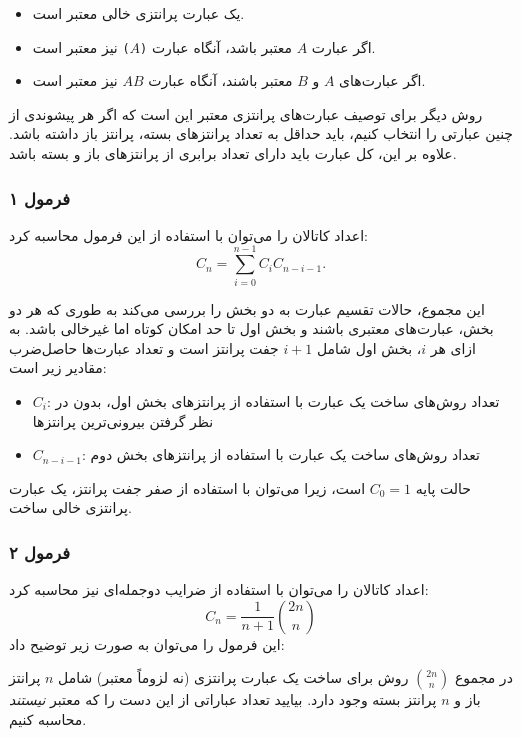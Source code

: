 \begin{itemize}
\item یک عبارت پرانتزی خالی معتبر است.
\item اگر عبارت $A$ معتبر باشد،
آنگاه عبارت
\texttt{(}$A$\texttt{)} نیز معتبر است.
\item اگر عبارت‌های $A$ و $B$ معتبر باشند،
آنگاه عبارت $AB$ نیز معتبر است.
\end{itemize}

روش دیگر برای توصیف عبارت‌های پرانتزی
معتبر این است که اگر
هر پیشوندی از چنین عبارتی را انتخاب کنیم،
باید حداقل به تعداد پرانتزهای بسته، پرانتز باز
داشته باشد.
علاوه بر این، کل عبارت باید
دارای تعداد برابری از پرانتزهای باز و بسته
باشد.

\subsubsection{فرمول ۱}

اعداد کاتالان را می‌توان با استفاده از این فرمول محاسبه کرد:
\[ C_n = \sum_{i=0}^{n-1} C_{i} C_{n-i-1}.\]

این مجموع، حالات تقسیم
عبارت به دو بخش را بررسی می‌کند
به طوری که هر دو بخش، عبارت‌های
معتبری باشند و بخش اول تا حد امکان کوتاه
اما غیرخالی باشد.
به ازای هر $i$، بخش اول شامل $i+1$ جفت
پرانتز است و تعداد عبارت‌ها
حاصل‌ضرب مقادیر زیر است:

\begin{itemize}
\item $C_{i}$: تعداد روش‌های ساخت یک عبارت
با استفاده از پرانتزهای بخش اول،
بدون در نظر گرفتن بیرونی‌ترین پرانتزها
\item $C_{n-i-1}$: تعداد روش‌های ساخت یک
عبارت با استفاده از پرانتزهای بخش دوم
\end{itemize}

حالت پایه $C_0=1$ است،
زیرا می‌توان با استفاده از صفر جفت پرانتز، یک عبارت پرانتزی
خالی ساخت.

\subsubsection{فرمول ۲}

اعداد کاتالان را می‌توان
با استفاده از ضرایب دوجمله‌ای نیز محاسبه کرد:
\[ C_n = \frac{1}{n+1} {2n \choose n}\]
این فرمول را می‌توان به صورت زیر توضیح داد:

در مجموع ${2n \choose n}$ روش
برای ساخت یک عبارت پرانتزی (نه لزوماً معتبر)
شامل $n$ پرانتز باز و $n$ پرانتز بسته وجود دارد.
بیایید تعداد عباراتی از این دست را که معتبر \emph{نیستند}
محاسبه کنیم.

